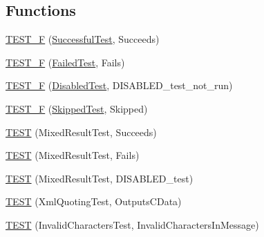\subsection*{Functions}
\begin{DoxyCompactItemize}
\item 
\mbox{\hyperlink{_obj__test_2lib_2googletest-master_2googletest_2test_2gtest__xml__output__unittest___8cc_aa6dc865a2584304f44da9f4b085f8e08}{T\+E\+S\+T\+\_\+F}} (\mbox{\hyperlink{class_successful_test}{Successful\+Test}}, Succeeds)
\item 
\mbox{\hyperlink{_obj__test_2lib_2googletest-master_2googletest_2test_2gtest__xml__output__unittest___8cc_a0789e983f69fddd50cd6a2ad73a167c2}{T\+E\+S\+T\+\_\+F}} (\mbox{\hyperlink{class_failed_test}{Failed\+Test}}, Fails)
\item 
\mbox{\hyperlink{_obj__test_2lib_2googletest-master_2googletest_2test_2gtest__xml__output__unittest___8cc_a743749af716f6da79472d5a662e31723}{T\+E\+S\+T\+\_\+F}} (\mbox{\hyperlink{class_disabled_test}{Disabled\+Test}}, D\+I\+S\+A\+B\+L\+E\+D\+\_\+test\+\_\+not\+\_\+run)
\item 
\mbox{\hyperlink{_obj__test_2lib_2googletest-master_2googletest_2test_2gtest__xml__output__unittest___8cc_a811b400874cfe6e10b4cfa3d0ef30fab}{T\+E\+S\+T\+\_\+F}} (\mbox{\hyperlink{class_skipped_test}{Skipped\+Test}}, Skipped)
\item 
\mbox{\hyperlink{_obj__test_2lib_2googletest-master_2googletest_2test_2gtest__xml__output__unittest___8cc_a32b81caf894a39956292191e0ac9efe8}{T\+E\+ST}} (Mixed\+Result\+Test, Succeeds)
\item 
\mbox{\hyperlink{_obj__test_2lib_2googletest-master_2googletest_2test_2gtest__xml__output__unittest___8cc_adb093d371e5672f26e82d2df1e66e311}{T\+E\+ST}} (Mixed\+Result\+Test, Fails)
\item 
\mbox{\hyperlink{_obj__test_2lib_2googletest-master_2googletest_2test_2gtest__xml__output__unittest___8cc_a34e71da1ce98b2984594c8db97018c75}{T\+E\+ST}} (Mixed\+Result\+Test, D\+I\+S\+A\+B\+L\+E\+D\+\_\+test)
\item 
\mbox{\hyperlink{_obj__test_2lib_2googletest-master_2googletest_2test_2gtest__xml__output__unittest___8cc_a6ac53dbcf6b02f01cc4f2486db8dd9dc}{T\+E\+ST}} (Xml\+Quoting\+Test, Outputs\+C\+Data)
\item 
\mbox{\hyperlink{_obj__test_2lib_2googletest-master_2googletest_2test_2gtest__xml__output__unittest___8cc_aa07f760144874b77158b9336bdc95c93}{T\+E\+ST}} (Invalid\+Characters\+Test, Invalid\+Characters\+In\+Message)

\end{DoxyCompactItemize}
